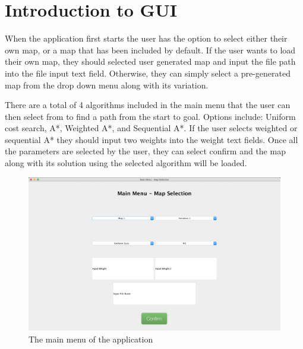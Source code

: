 \section{Introduction to GUI}

When the application first starts the user has the option to select either their own
map, or a map that has been included by default. If the user wants to load their own map, they should selected
user generated map and input the file path into the file input text field. Otherwise, they
can simply select a pre-generated map from the drop down menu along with its variation.

There are a total of 4 algorithms included in the main menu that the user can then select from to find a path
from the start to goal. Options include: Uniform cost search, A*, Weighted A*, and Sequential A*. If the
user selects weighted or sequential A* they should input two weights into the weight text fields. Once all the parameters
are selected by the user, they can select confirm and the map along with its solution using the selected algorithm
will be loaded.


\begin{figure}[H]
	\centering
  \includegraphics[scale = 0.30]{main_menu.png}
	\caption{The main menu of the application}
	\label{fig: Main menu}
\end{figure}
